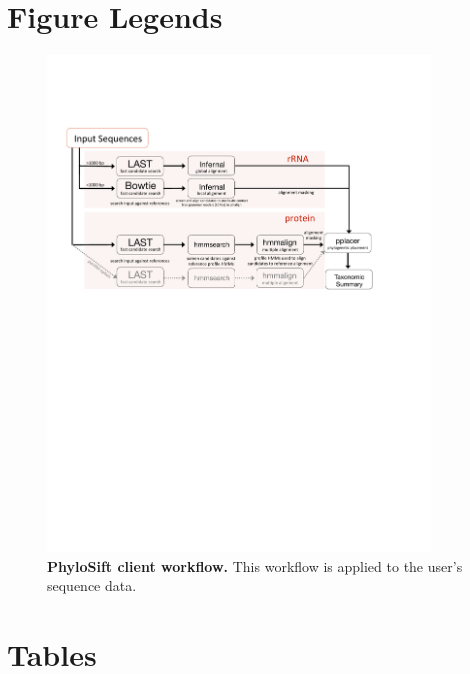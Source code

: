 \documentclass[10pt]{article}
\begin{document}
\section*{Figure Legends}
\begin{figure}[hp]
\begin{center}
\includegraphics[width=4in]{figures/Phylosift_overview_vector.pdf}
\end{center}
\caption{\textbf{PhyloSift client workflow.} This workflow is applied to the user's sequence data.}
\label{fig:overview}
\end{figure}

\clearpage

\section*{Tables}


\clearpage
\end{document}
